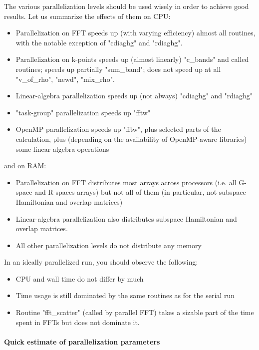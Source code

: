 \documentclass[12pt,a4paper]{article}
\begin{document}
The various parallelization levels should be used wisely in order to 
achieve good results. Let us summarize the effects of them on CPU:
\begin{itemize}
\item
  Parallelization on FFT speeds up (with varying efficiency) almost 
  all routines, with the notable exception of "cdiaghg" and "rdiaghg".
\item
  Parallelization on k-points speeds up (almost linearly) "c\_bands" and 
  called routines; speeds up partially "sum\_band"; does not speed up
  at all "v\_of\_rho", "newd", "mix\_rho".
\item
  Linear-algebra parallelization speeds up (not always) "cdiaghg" and "rdiaghg" 
\item
  "task-group" parallelization speeds up "fftw"
\item
  OpenMP parallelization speeds up "fftw", plus selected parts of the 
  calculation, plus (depending on the availability of OpenMP-aware
  libraries) some linear algebra operations
\end{itemize}
and on RAM:
\begin{itemize}
\item
  Parallelization on FFT distributes most arrays across processors
  (i.e. all G-space and R-spaces arrays) but not all of them (in
  particular, not subspace Hamiltonian and overlap matrices)
\item
  Linear-algebra parallelization also distributes subspace Hamiltonian
  and overlap matrices.
\item
  All other parallelization levels do not distribute any memory
\end{itemize}
In an ideally parallelized run, you should observe the following:
\begin{itemize}
\item
  CPU and wall time do not differ by much
\item
  Time usage is still dominated by the same routines as for the serial run
\item
  Routine "fft\_scatter" (called by parallel FFT) takes a sizable part of
  the time spent in FFTs but does not dominate it.
\end{itemize}

\paragraph{ Quick estimate of parallelization parameters}
\end{document}
